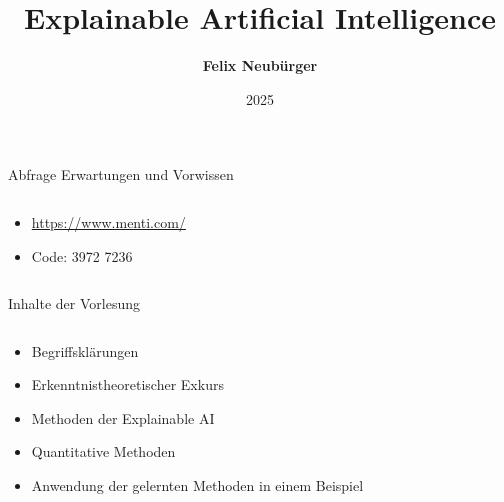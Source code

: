 \documentclass[aspectratio=1610, xcolor=dvipsnames, 9pt]{beamer}
\title{Explainable Artificial Intelligence}
\author[F.~Neubürger]{ \textbf{Felix Neubürger}}
\institute[I \& W]{Fachhochschule Südwestfalen, Ingenieurs- \& Wirtschaftswissenschaften}
\date{2025}
\begin{document}
\maketitle
\begin{frame}{Abfrage Erwartungen und Vorwissen}
  \begin{columns}
    \begin{column}{1\textwidth}
      \begin{itemize}
        \item \url{https://www.menti.com/} \newline
        \item Code: 3972 7236
      \end{itemize}
    \end{column}
    \begin{column}{0\textwidth}
    \end{column}
  \end{columns}
\end{frame}

\begin{frame}{Inhalte der Vorlesung}
  \begin{columns}
    \begin{column}{1\textwidth}
      \begin{itemize}
        \item Begriffsklärungen\newline
        \item Erkenntnistheoretischer Exkurs \newline
        \item Methoden der Explainable AI  \newline
        \item Quantitative Methoden \newline 
        \item Anwendung der gelernten Methoden in einem Beispiel
      \end{itemize}
    \end{column}
    \begin{column}{0\textwidth}
    \end{column}
  \end{columns}
\end{frame}
\end{document}
